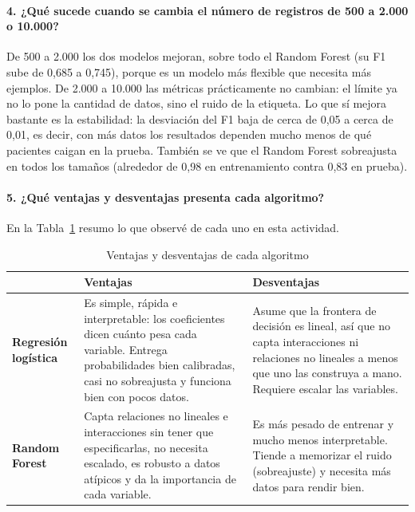 \documentclass[11pt,letterpaper]{article}
\begin{document}
\paragraph{4. ¿Qué sucede cuando se cambia el número de registros de 500 a 2.000 o 10.000?}
De 500 a 2.000 los dos modelos mejoran, sobre todo el Random Forest (su F1 sube de 0,685 a 0,745), porque
es un modelo más flexible que necesita más ejemplos. De 2.000 a 10.000 las métricas prácticamente no cambian:
el límite ya no lo pone la cantidad de datos, sino el ruido de la etiqueta. Lo que sí mejora bastante es la
estabilidad: la desviación del F1 baja de cerca de 0,05 a cerca de 0,01, es decir, con más datos los resultados
dependen mucho menos de qué pacientes caigan en la prueba. También se ve que el Random Forest sobreajusta en
todos los tamaños (alrededor de 0,98 en entrenamiento contra 0,83 en prueba).

\paragraph{5. ¿Qué ventajas y desventajas presenta cada algoritmo?}
En la Tabla~\ref{tab:ventajas} resumo lo que observé de cada uno en esta actividad.

\begin{table}[H]
\centering
\caption{Ventajas y desventajas de cada algoritmo}
\label{tab:ventajas}
\small
\begin{tabularx}{\linewidth}{lXX}
\toprule
& \textbf{Ventajas} & \textbf{Desventajas} \\
\midrule
\textbf{Regresión logística} &
Es simple, rápida e interpretable: los coeficientes dicen cuánto pesa cada variable. Entrega probabilidades
bien calibradas, casi no sobreajusta y funciona bien con pocos datos. &
Asume que la frontera de decisión es lineal, así que no capta interacciones ni relaciones no lineales a menos
que uno las construya a mano. Requiere escalar las variables. \\
\addlinespace
\textbf{Random Forest} &
Capta relaciones no lineales e interacciones sin tener que especificarlas, no necesita escalado, es robusto
a datos atípicos y da la importancia de cada variable. &
Es más pesado de entrenar y mucho menos interpretable. Tiende a memorizar el ruido (sobreajuste) y necesita
más datos para rendir bien. \\
\bottomrule
\end{tabularx}
\end{table}

\newpage
\end{document}
